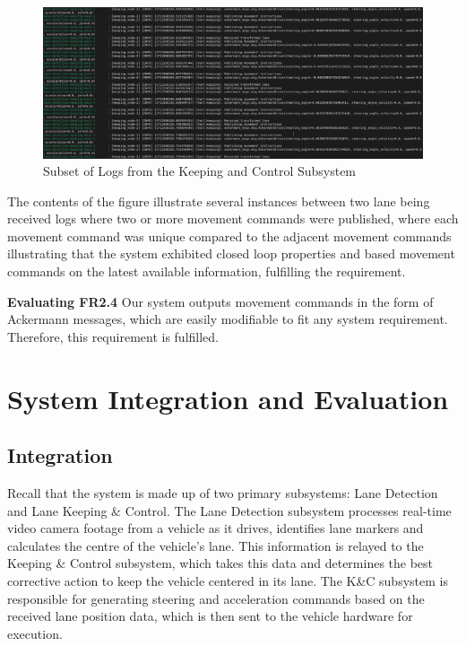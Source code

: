 \documentclass[titlepage,draft]{article}
\begin{document}
{\begin{figure}
	\centering
	\includegraphics[width=6in]{fr23}
	\caption{Subset of Logs from the Keeping and Control Subsystem }
	\label{fig:fr23}
\end{figure}

The contents of the figure illustrate several instances between two lane being received logs where two or more movement commands were published, where each movement command was unique compared to the adjacent movement commands illustrating that the system exhibited closed loop properties and based movement commands on the latest available information, fulfilling the requirement.

\textbf{Evaluating FR2.4}
Our system outputs movement commands in the form of Ackermann messages, which are easily modifiable to fit any system requirement. Therefore, this requirement is fulfilled.


\section{System Integration and Evaluation}

\subsection{Integration}
Recall that the system is made up of two primary subsystems: Lane Detection and Lane Keeping \& Control. The Lane Detection subsystem processes real-time video camera footage from a vehicle as it drives, identifies lane markers and calculates the centre of the vehicle's lane. This information is relayed to the Keeping \& Control subsystem, which takes this data and determines the best corrective action to keep the vehicle centered in its lane. The K\&C subsystem is responsible for generating steering and acceleration commands based on the received lane position data, which is then sent to the vehicle hardware for execution.


}
\end{document}
